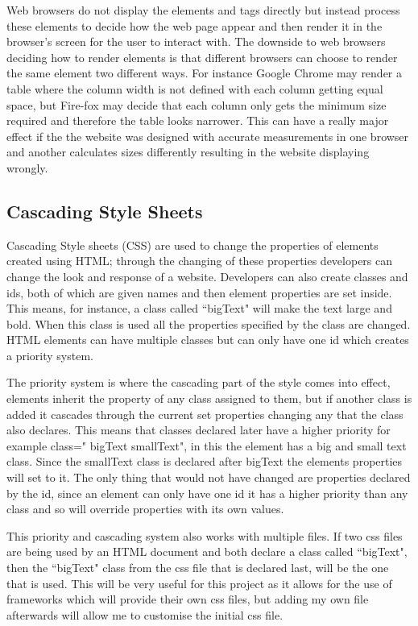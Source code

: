 \documentclass[11pt]{report}
\begin{document}
\noindent Web browsers do not display the elements and tags directly \cite{w3_introduction_????} but instead process these elements to decide how the web page appear and then render it in the browser's screen for the user to interact with. The downside to web browsers deciding how to render elements is that different browsers can choose to render the same element two different ways. For instance Google Chrome may render a table where the column width is not defined with each column getting equal space, but Fire-fox  may decide that each column only gets the minimum size required and therefore the table looks narrower. This can have a really major effect if the the website was designed with accurate measurements in one browser and another calculates sizes differently resulting in the website displaying wrongly.    


\subsection{Cascading Style Sheets}
Cascading Style sheets (CSS)\cite{lie_cascading_2005} are used to change the properties of elements created using HTML; through the changing of these properties developers can change the look and response of a website. Developers can also create classes and ids, both of which are given names and then element properties are set inside. This means, for instance, a class called ``bigText" will make the text large and bold. When this class is used all the properties specified by the class are changed. HTML elements can have multiple classes but can only have one id which creates a priority system. 

The priority system \cite{_cascading_????-1} is where the cascading part of the style comes into effect, elements inherit the property of any class assigned to them, but if another class is added it cascades through the current set properties changing any that the class also declares. This means that classes declared later have a higher priority for example class=" bigText smallText", in this the element has a big and small text class. Since the smallText class is declared after bigText the elements properties will set to it. The only thing that would not have changed are properties declared by the id, since an element can only have one id it has a higher priority than any class and so will override properties with its own values.  

This priority and cascading system also works with multiple files. If two css files are being used by an HTML document and both declare a class called ``bigText", then the ``bigText" class from the css file that is declared last, will be the one that is used. This will be very useful for this project as it allows for the use of frameworks which will provide their own css files, but adding my own file afterwards will allow me to customise the initial css file.
\end{document}
